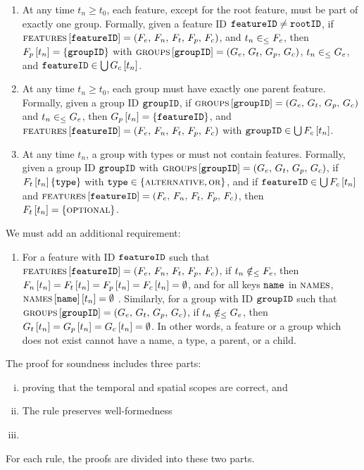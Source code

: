 \begin{enumerate}[\itbf{WF\arabic*}, itemsep=0mm]
   \item At any time $t_n \geq t_0$, each feature, except for the root feature, must be part of exactly one group. Formally, given a feature ID $\texttt{featureID} \neq \texttt{rootID}$, if $\textsc{features} \left[ \texttt{featureID} \right] = \left(F_e,\, F_n,\, F_t,\, F_p,\, F_c\right)$, and $t_n \in_\leq F_e$, then $F_p \left[ t_n \right] = \left\{\texttt{groupID}\right\}$ with $\textsc{groups}{} \left[ \texttt{groupID} \right] = \left(G_e,\, G_t,\, G_p,\, G_c\right)$, $t_n \in_\leq G_e$, and $\texttt{featureID} \in \bigcup G_c \left[ t_n \right]$. 
   \item At any time $t_n \geq t_0$, each group must have exactly one parent feature. Formally, given a group ID $\texttt{groupID}$, if $\textsc{groups}{} \left[ \texttt{groupID} \right] = \left(G_e,\, G_t,\, G_p,\, G_c\right)$ and $t_n \in_\leq G_e$, then $G_p \left[ t_n \right] = \left\{\texttt{featureID}\right\}$, and $\textsc{features} \left[ \texttt{featureID} \right] = \left(F_e,\, F_n,\, F_t,\, F_p,\, F_c\right)$ with $\texttt{groupID} \in \bigcup F_c \left[ t_n \right]$.
   \item At any time $t_n$, a group with types \xortype{} or \ortype{} must not contain \mandatory{} features. Formally, given a group ID $\texttt{groupID}$ with $\textsc{groups}{} \left[ \texttt{groupID} \right] = \left(G_e,\, G_t,\, G_p,\, G_c\right)$, if $F_t \left[ t_n \right] \left\{\texttt{type}\right\}$ with $\texttt{type} \in \left\{\textsc{alternative}{}, \textsc{or}{}\right\}$, and if $\texttt{featureID} \in \bigcup F_c \left[ t_n \right]$ and $\textsc{features} \left[ \texttt{featureID} \right] = \left(F_e,\, F_n,\, F_t,\, F_p,\, F_c\right)$, then $F_t \left[ t_n \right] = \left\{\textsc{optional}\right\}$.
\end{enumerate}

We must add an additional requirement:
\begin{enumerate}[\itbf{WF8}]
   \item For a feature with ID $\texttt{featureID}$ such that $\textsc{features} \left[ \texttt{featureID} \right] = \left(F_e,\, F_n,\, F_t,\, F_p,\, F_c\right)$, if $t_n \notin_\leq F_e$, then $F_n \left[ t_n \right] = F_t \left[ t_n \right] = F_p \left[ t_n \right] = F_c \left[ t_n \right] = \emptyset$, and for all keys $\texttt{name}$ in $\textsc{names}$, $\textsc{names} \left[ \texttt{name} \right] \left[ t_n \right] = \emptyset$ . Similarly, for a group with ID $\texttt{groupID}$ such that $\textsc{groups}{} \left[ \texttt{groupID} \right] = \left(G_e,\, G_t,\, G_p,\, G_c\right)$, if $t_n \notin_\leq G_e$, then $G_t \left[ t_n \right] = G_p \left[ t_n \right] = G_c \left[ t_n \right] = \emptyset$. In other words, a feature or a group which does not exist cannot have a name, a type, a parent, or a child.
\end{enumerate}


The proof for soundness includes three parts: 
\begin{enumerate}[(i)]
   \item proving that the temporal and spatial scopes are correct,  and
\item The rule preserves well-formedness 
   \item {}
\end{enumerate}
For each rule, the proofs are divided into these two parts.

